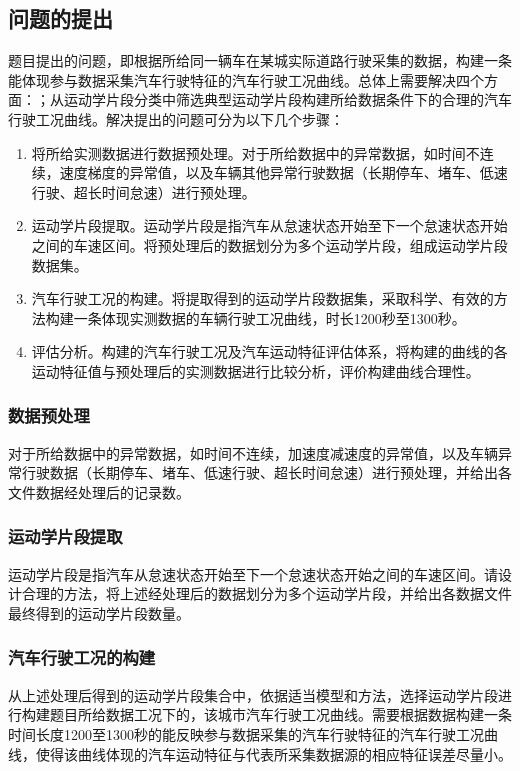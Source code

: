 \documentclass[bwprint]{gmcmthesis}
\begin{document}
\subsection{问题的提出}
题目提出的问题，即根据所给同一辆车在某城实际道路行驶采集的数据，构建一条能体现参与数据采集汽车行驶特征的汽车行驶工况曲线。总体上需要解决四个方面：；从运动学片段分类中筛选典型运动学片段构建所给数据条件下的合理的汽车行驶工况曲线。解决提出的问题可分为以下几个步骤：
\begin{enumerate}
\item 将所给实测数据进行数据预处理。对于所给数据中的异常数据，如时间不连续，速度梯度的异常值，以及车辆其他异常行驶数据（长期停车、堵车、低速行驶、超长时间怠速）进行预处理。
\item 运动学片段提取。运动学片段是指汽车从怠速状态开始至下一个怠速状态开始之间的车速区间。将预处理后的数据划分为多个运动学片段，组成运动学片段数据集。
\item 汽车行驶工况的构建。将提取得到的运动学片段数据集，采取科学、有效的方法构建一条体现实测数据的车辆行驶工况曲线，时长1200秒至1300秒。
\item 评估分析。构建的汽车行驶工况及汽车运动特征评估体系，将构建的曲线的各运动特征值与预处理后的实测数据进行比较分析，评价构建曲线合理性。
\end{enumerate}

\subsubsection{数据预处理}
对于所给数据中的异常数据，如时间不连续，加速度减速度的异常值，以及车辆异常行驶数据（长期停车、堵车、低速行驶、超长时间怠速）进行预处理，并给出各文件数据经处理后的记录数。

\subsubsection{运动学片段提取}
运动学片段是指汽车从怠速状态开始至下一个怠速状态开始之间的车速区间。请设计合理的方法，将上述经处理后的数据划分为多个运动学片段，并给出各数据文件最终得到的运动学片段数量。

\subsubsection{汽车行驶工况的构建}
从上述处理后得到的运动学片段集合中，依据适当模型和方法，选择运动学片段进行构建题目所给数据工况下的，该城市汽车行驶工况曲线。需要根据数据构建一条时间长度1200至1300秒的能反映参与数据采集的汽车行驶特征的汽车行驶工况曲线，使得该曲线体现的汽车运动特征与代表所采集数据源的相应特征误差尽量小。
\end{document}
